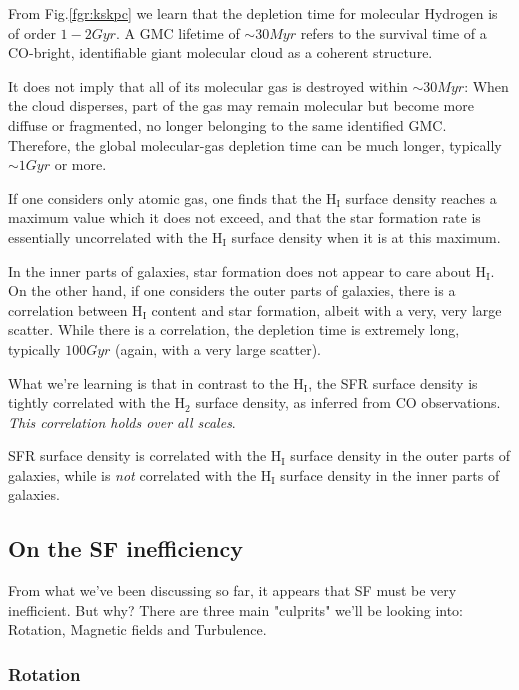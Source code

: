 \par From Fig.\ref{fgr:kskpc} we learn that the depletion time for molecular Hydrogen is of order $1-2\unit{Gyr}$. A GMC lifetime of $\sim 30\unit{Myr}$ refers to the survival time of a CO-bright, identifiable giant molecular cloud as a coherent structure.
\par It does not imply that all of its molecular gas is destroyed within $\sim 30\unit{Myr}$: When the cloud disperses, part of the gas may remain molecular but become more diffuse or fragmented, no longer belonging to the same identified GMC. Therefore, the global molecular-gas depletion time can be much longer, typically $\sim 1\unit{Gyr}$ or more.
\par If one considers only atomic gas, one finds that the H$_{\text{I}}$ surface density reaches a maximum value which it does not exceed, and that the star formation rate is essentially uncorrelated with the H$_{\text{I}}$ surface density when it is at this maximum.
\par In the inner parts of galaxies, star formation does not appear to care about H$_{\text{I}}$. On the other hand, if one considers the outer parts of galaxies, there is a correlation between H$_{\text{I}}$ content and star formation, albeit with a very, very large scatter. While there is a correlation, the depletion time is extremely long, typically $100\unit{Gyr}$ (again, with a very large scatter).
\par What we're learning is that in contrast to the H$_{\text{I}}$, the SFR surface density is tightly correlated with the H$_{2}$ surface density, as inferred from CO observations. \emph{This correlation holds over all scales}.
\par SFR surface density is correlated with the H$_{\text{I}}$ surface density in the outer parts of galaxies, while is \emph{not} correlated with the H$_{\text{I}}$ surface density in the inner parts of galaxies.
\subsection{On the SF inefficiency}
From what we've been discussing so far, it appears that SF must be very inefficient. But why? There are three main "culprits" we'll be looking into: Rotation, Magnetic fields and Turbulence.

\subsubsection*{Rotation}

